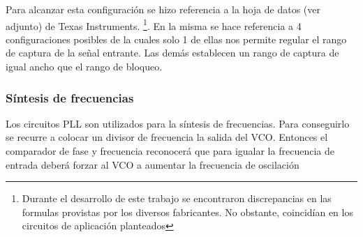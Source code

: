 Para alcanzar esta configuración se hizo referencia a la hoja de datos (ver adjunto) de Texas Instruments. \footnote{Durante el desarrollo de este trabajo se encontraron discrepancias en las formulas provistas por los diversos fabricantes. No obstante, coincidían en los circuitos de aplicación planteados}.
En la misma se hace referencia a 4 configuraciones posibles de la cuales solo 1 de ellas nos permite regular el rango de captura de la señal entrante. Las demás establecen un rango de captura de igual ancho que el rango de bloqueo.


\subsubsection{Síntesis de frecuencias}
Los circuitos PLL son utilizados para la síntesis de frecuencias. Para conseguirlo se recurre a colocar un divisor de frecuencia  la salida del VCO. Entonces el comparador de fase y frecuencia reconocerá que para igualar la frecuencia de entrada deberá forzar al VCO a aumentar la frecuencia de oscilación




%

